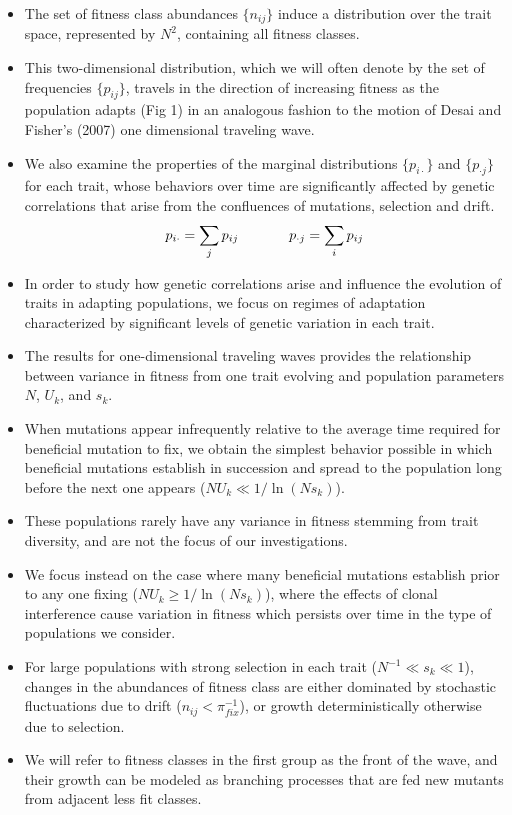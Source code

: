 \documentclass[12pt,one column]{article}
\begin{document}
\begin{itemize}
\begin{itemize}
		\item The set of fitness class abundances $\{n_{ij} \}$ induce a distribution over the trait space, represented by $N^2$, containing all fitness classes. 
		\item This two-dimensional distribution, which we will often denote by the set of frequencies $\{p_{ij}\}$, travels in the direction of increasing fitness as the population adapts (Fig 1) in an analogous fashion to the motion of Desai and Fisher’s (2007) one dimensional traveling wave. 
		\item We also examine the properties of the marginal distributions $\{p_{i\cdot}\}$ and $\{p_{\cdot j}\}$ for each trait, whose behaviors over time are significantly affected by genetic correlations that arise from the confluences of mutations, selection and drift. \[ p_{i \cdot }= \sum_j p_{ij} \hspace{0.5in} p_{\cdot j}= \sum_i p_{ij} \]
		\item In order to study how genetic correlations arise and influence the evolution of traits in adapting populations, we focus on regimes of adaptation characterized by significant levels of genetic variation in each trait. 
		\item The results for one-dimensional traveling waves provides the relationship between variance in fitness from one trait evolving and population parameters $N$, $U_k$, and $s_k$. 
		\item When mutations appear infrequently relative to the average time required for beneficial mutation to fix, we obtain the simplest behavior possible in which beneficial mutations establish in succession and spread to the population long before the next one appears ($N U_k \ll 1/\ln(N s_k)$). 
		\item These populations rarely have any variance in fitness stemming from trait diversity, and are not the focus of our investigations. 
		\item We focus instead on the case where many beneficial mutations establish prior to any one fixing ($N U_k \geq 1/\ln(N s_k)$), where the effects of clonal interference cause variation in fitness which persists over time in the type of populations we consider. 
		\item For large populations with strong selection in each trait ($N^{-1}\ll s_k \ll 1$), changes in the abundances of fitness class are either dominated by stochastic fluctuations due to drift ($n_{ij}<\pi_{fix}^{-1}$), or growth deterministically otherwise due to selection. 
		\item We will refer to fitness classes in the first group as the front of the wave, and their growth can be modeled as branching processes that are fed new mutants from adjacent less fit classes. 

\end{itemize}
\end{itemize}
\end{document}
